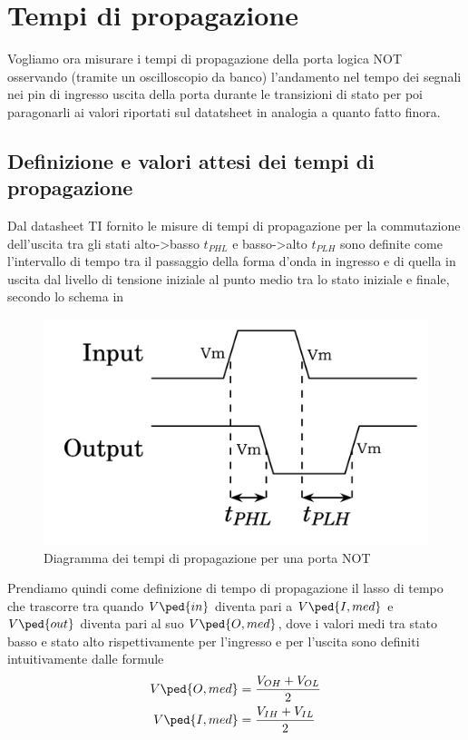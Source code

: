 \documentclass[10pt, a4paper, italian]{article}
\begin{document}
\section{Tempi di propagazione}
Vogliamo ora misurare i tempi di propagazione della porta logica NOT
osservando (tramite un oscilloscopio da banco) l'andamento nel tempo dei
segnali nei pin di ingresso uscita della porta durante le transizioni di stato
per poi paragonarli ai valori riportati sul datatsheet in analogia a quanto
fatto finora.

\subsection{Definizione e valori attesi dei tempi di propagazione}
Dal datasheet TI fornito le misure di tempi di propagazione per la commutazione
dell'uscita tra gli stati alto->basso $t_{PHL}$ e basso->alto $t_{PLH}$ sono
definite come l'intervallo di tempo tra il passaggio della forma d'onda in
ingresso e di quella in uscita dal livello di tensione iniziale al punto
medio tra lo stato iniziale e finale, secondo lo schema in 

\begin{figure}[htbp]
\centering
	\includegraphics[scale=0.4]{notdelay_mark}
	\caption{Diagramma dei tempi di propagazione per una porta NOT}
\end{figure}

Prendiamo quindi come definizione di tempo di propagazione il lasso di tempo
che trascorre tra quando $V\ped{in}$ diventa pari a $V\ped{I, med}$ e
$V\ped{out}$ diventa pari al suo $V\ped{O, med}$, dove i valori medi tra stato
basso e stato alto rispettivamente per l'ingresso e per l'uscita sono
definiti intuitivamente dalle formule
\begin{align*}
V\ped{O, med} &= \frac{V_{OH} + V_{OL}}{2} \\
V\ped{I, med} &= \frac{V_{IH} + V_{IL}}{2} \\
\end{align*}
\end{document}
